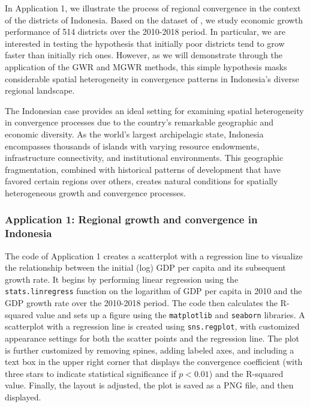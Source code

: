 \documentclass[smallextended, natbib]{svjour3}       %
\begin{document}
In Application 1, we illustrate the process of regional convergence in the context of the districts of Indonesia. 
Based on the dataset of \cite{aginta2023regional}, we study economic growth performance of 514 districts over the 2010-2018 period. 
In particular, we are interested in testing the hypothesis that initially poor districts tend to grow faster than initially rich ones. However, as we will demonstrate through the application of the GWR and MGWR methods, this simple hypothesis masks considerable spatial heterogeneity in convergence patterns in Indonesia's diverse regional landscape.

The Indonesian case provides an ideal setting for examining spatial heterogeneity in convergence processes due to the country's remarkable geographic and economic diversity. 
As the world's largest archipelagic state, Indonesia encompasses thousands of islands with varying resource endowments, infrastructure connectivity, and institutional environments. 
This geographic fragmentation, combined with historical patterns of development that have favored certain regions over others, creates natural conditions for spatially heterogeneous growth and convergence processes.


\subsubsection*{Application 1: Regional growth and convergence in Indonesia}

The code of Application 1 creates a scatterplot with a regression line to visualize the relationship between the initial (log) GDP per capita and its subsequent growth rate.
It begins by performing linear regression using the \verb|stats.linregress| function on the logarithm of GDP per capita in 2010 and the GDP growth rate over the 2010-2018 period. 
The code then calculates the R-squared value and sets up a figure using the \verb|matplotlib| and \verb|seaborn| libraries. 
A scatterplot with a regression line is created using \verb|sns.regplot|, with customized appearance settings for both the scatter points and the regression line. 
The plot is further customized by removing spines, adding labeled axes, and including a text box in the upper right corner that displays the convergence coefficient (with three stars to indicate statistical significance if $p < 0.01$) and the R-squared value. 
Finally, the layout is adjusted, the plot is saved as a PNG file, and then displayed. 
\end{document}
